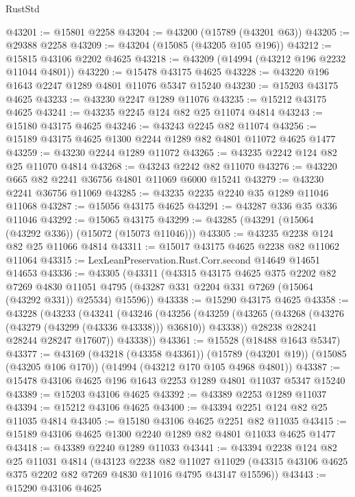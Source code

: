 \begin{lexlean}{RustStd}
\begin{coremodule}
@43201 := @15801 @2258
@43204 := @43200 (@15789 (@43201 @63))
@43205 := @29388 @2258
@43209 := @43204 (@15085 (@43205 @105 @196))
@43212 := @15815 @43106 @2202 @4625
@43218 := @43209 (@14994 (@43212 @196 @2232 @11044 @4801))
@43220 := @15478 @43175 @4625
@43228 := @43220 @196 @1643 @2247 @1289 @4801 @11076 @5347 @15240
@43230 := @15203 @43175 @4625
@43233 := @43230 @2247 @1289 @11076
@43235 := @15212 @43175 @4625
@43241 := @43235 @2245 @124 @82 @25 @11074 @4814
@43243 := @15180 @43175 @4625
@43246 := @43243 @2245 @82 @11074
@43256 := @15189 @43175 @4625 @1300 @2244 @1289 @82 @4801 @11072 @4625 @1477
@43259 := @43230 @2244 @1289 @11072
@43265 := @43235 @2242 @124 @82 @25 @11070 @4814
@43268 := @43243 @2242 @82 @11070
@43276 := @43220 @665 @82 @2241 @36756 @4801 @11069 @6000 @15241
@43279 := @43230 @2241 @36756 @11069
@43285 := @43235 @2235 @2240 @35 @1289 @11046 @11068
@43287 := @15056 @43175 @4625
@43291 := @43287 @336 @35 @336 @11046
@43292 := @15065 @43175
@43299 := @43285 (@43291 (@15064 (@43292 @336)) (@15072 (@15073 @11046)))
@43305 := @43235 @2238 @124 @82 @25 @11066 @4814
@43311 := @15017 @43175 @4625 @2238 @82 @11062 @11064
@43315 := LexLeanPreservation.Rust.Corr.second @14649 @14651 @14653
@43336 := @43305
    (@43311
      (@43315
        @43175
        @4625
        @375
        @2202
        @82
        @7269
        @4830
        @11051
        @4795
        (@43287 @331 @2204 @331 @7269 (@15064 (@43292 @331)) @25534)
        @15596))
@43338 := @15290 @43175 @4625
@43358 := @43228
    (@43233
      (@43241
        (@43246
          (@43256
            (@43259 (@43265 (@43268 (@43276 (@43279 (@43299 (@43336 @43338))) @36810)) @43338))
            @28238
            @28241
            @28244
            @28247
            @17607))
        @43338))
@43361 := @15528 (@18488 @1643 @5347)
@43377 := @43169
    (@43218 (@43358 @43361))
    (@15789 (@43201 @19))
    (@15085 (@43205 @106 @170))
    (@14994 (@43212 @170 @105 @4968 @4801))
@43387 := @15478 @43106 @4625 @196 @1643 @2253 @1289 @4801 @11037 @5347 @15240
@43389 := @15203 @43106 @4625
@43392 := @43389 @2253 @1289 @11037
@43394 := @15212 @43106 @4625
@43400 := @43394 @2251 @124 @82 @25 @11035 @4814
@43405 := @15180 @43106 @4625 @2251 @82 @11035
@43415 := @15189 @43106 @4625 @1300 @2240 @1289 @82 @4801 @11033 @4625 @1477
@43418 := @43389 @2240 @1289 @11033
@43441 := @43394
    @2238
    @124
    @82
    @25
    @11031
    @4814
    (@43123
      @2238
      @82
      @11027
      @11029
      (@43315 @43106 @4625 @375 @2202 @82 @7269 @4830 @11016 @4795 @43147 @15596))
@43443 := @15290 @43106 @4625

\end{coremodule}
\end{lexlean}
